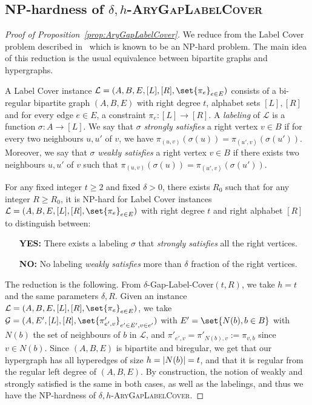 \subsection{NP-hardness of $\delta,h$-\textsc{AryGapLabelCover}}
\label{app:NPhardnessGap}
\begin{proof}[Proof of Proposition~\ref{prop:AryGapLabelCover}]
  We reduce from the Label Cover problem described in~\cite{DMMS20} which is known to be an NP-hard problem. The main idea of this reduction is the usual equivalence between bipartite graphs and hypergraphs.

  \begin{definition}
    A Label Cover instance $\mathcal{L} = (A,B,E,[L],[R],\set{\pi_e}_{e \in E})$ consists of a bi-regular bipartite graph $(A,B,E)$ with right degree $t$, alphabet sets $[L],[R]$ and for every edge $e \in E$, a constraint $\pi_e :[L] \rightarrow [R]$.
    A \emph{labeling} of $\mathcal{L}$ is a function $\sigma : A \rightarrow [L]$. We say that $\sigma$ \emph{strongly satisfies} a right vertex $v \in B$ if for every two neighbours $u,u'$ of $v$, we have $\pi_{(u,v)}(\sigma(u)) = \pi_{(u',v)}(\sigma(u'))$. Moreover, we say that  $\sigma$ \emph{weakly satisfies} a right vertex $v \in B$ if there exists two neighbours $u,u'$ of $v$ such that $\pi_{(u,v)}(\sigma(u)) = \pi_{(u',v)}(\sigma(u'))$.
  \end{definition}

 \begin{theorem}
  For any fixed integer $t \geq 2$ and fixed $\delta > 0$, there exists $R_0$ such that for any integer $R \geq R_0$, it is NP-hard for Label Cover instances $\mathcal{L} = (A,B,E,[L],[R],\set{\pi_e}_{e \in E})$ with right degree $t$ and right alphabet $[R]$ to distinguish between:
  
  \begin{itemize}
  \item[\textbf{YES:}] There exists a labeling $\sigma$ that \emph{strongly satisfies} all the right vertices.
  \item[\textbf{NO:}] No labeling \emph{weakly satisfies} more than $\delta$ fraction of the right vertices.
  \end{itemize}
\end{theorem}

 The reduction is the following. From $\delta$-Gap-Label-Cover$(t,R)$, we take $h=t$ and the same parameters $\delta,R$. Given an instance $\mathcal{L} = (A,B,E,[L],[R],\set{\pi_e}_{e \in E})$, we take $\mathcal{G} = (A,E',[L],[R],\set{\pi'_{e',v}}_{e' \in E',v \in e'})$ with $E' = \set{N(b), b \in B}$ with $N(b)$ the set of neighbours of $b$ in $\mathcal{L}$, and $\pi'_{e',v} = \pi'_{N(b),v} := \pi_{v,b}$ since $v \in N(b)$. Since $(A,B,E)$ is bipartite and biregular, we get that our hypergraph has all hyperedges of size $h = \abs{N(b)} = t$, and that it is regular from the regular left degree of $(A,B,E)$. By construction, the notion of weakly and strongly satisfied is the same in both cases, as well as the labelings, and thus we have the NP-hardness of $\delta,h$-\textsc{AryGapLabelCover}.


\end{proof}
